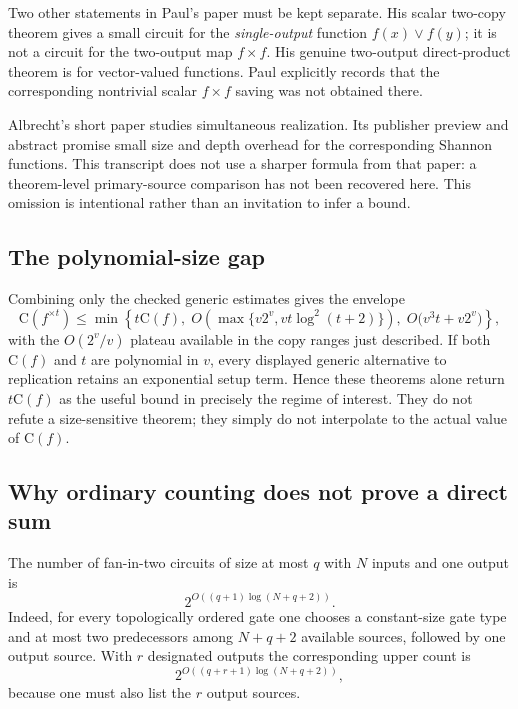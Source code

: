 \documentclass[11pt]{article}
\theoremstyle{definition}
\newcommand{\C}{\mathrm{C}}
\begin{document}
Two other statements in Paul's paper must be kept separate.  His scalar
two-copy theorem gives a small circuit for the \emph{single-output} function
$f(x)\vee f(y)$; it is not a circuit for the two-output map $f\times f$.
His genuine two-output direct-product theorem is for vector-valued functions.
Paul explicitly records that the corresponding nontrivial scalar
$f\times f$ saving was not obtained there.

Albrecht's short paper \cite{Albrecht1989} studies simultaneous realization.
Its publisher preview and abstract promise small size and depth overhead for
the corresponding Shannon functions.  This transcript does not use a sharper formula from that
paper: a theorem-level primary-source comparison has not been recovered here.
This omission is intentional rather than an invitation to infer a bound.

\subsection{The polynomial-size gap}

Combining only the checked generic estimates gives the envelope
\begin{equation}
 \C(f^{\times t})\le
 \min\left\{
   t\C(f),\;
   O\!\left(\max\{v2^v,vt\log^2(t+2)\}\right),\;
   O\bigl(v^3t+v2^v\bigr)
 \right\},
 \label{eq:known-envelope}
\end{equation}
with the $O(2^v/v)$ plateau available in the copy ranges just described.
If both $\C(f)$ and $t$ are polynomial in $v$, every displayed generic
alternative to replication retains an exponential setup term.  Hence these
theorems alone return $t\C(f)$ as the useful bound in precisely the regime of
interest.  They do not refute a size-sensitive theorem; they simply do not
interpolate to the actual value of $\C(f)$.

\subsection{Why ordinary counting does not prove a direct sum}

The number of fan-in-two circuits of size at most $q$ with $N$ inputs and
one output is
\begin{equation}
  2^{O((q+1)\log(N+q+2))}.
  \label{eq:circuit-count}
\end{equation}
Indeed, for every topologically ordered gate one chooses a constant-size gate
type and at most two predecessors among $N+q+2$ available sources, followed
by one output source.  With $r$ designated outputs the corresponding upper
count is
\begin{equation}
  2^{O((q+r+1)\log(N+q+2))},
  \label{eq:multioutput-count}
\end{equation}
because one must also list the $r$ output sources.
\end{document}
